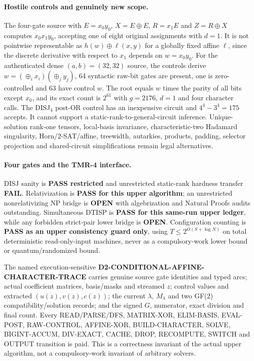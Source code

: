 \documentclass[11pt]{article}
\begin{document}
\paragraph{Hostile controls and genuinely new scope.}
The four-gate source with $E=x_0y_0$, $X=E\oplus E$, $R=x_1E$ and $Z=R\oplus X$ computes $x_0x_1y_0$, accepting one of eight original assignments with $d=1$.
It is not pointwise representable as $h(w)\oplus\ell(x,y)$ for a globally fixed affine $\ell$, since the discrete derivative with respect to $x_1$ depends on $w=x_0y_0$.
For the authenticated dense $(a,b)=(32,32)$ source, the controls derive $w=(\oplus_i x_i)(\oplus_j y_j)$, 64 syntactic raw-bit gates are present, one is zero-controlled and 63 have control $w$.
The root equals $w$ times the parity of all bits except $x_0$, and its exact count is $2^{61}$ with $g=2176$, $d=1$ and four character calls.
The DISJ$_4$ post-OR control has an inexpensive circuit and $4^4-3^4=175$ accepts.  It cannot support a static-rank-to-general-circuit inference. Unique-solution rank-one tensors, local-basis invariance, characteristic-two Hadamard singularity, Horn/2-SAT/affine, treewidth, autarkies, products, padding, selector projection and shared-circuit simplifications remain legal alternatives.

\paragraph{Four gates and the TMR-4 interface.}
DISJ sanity is \textbf{PASS restricted} and unrestricted static-rank hardness transfer \textbf{FAIL}.
Relativization is \textbf{PASS for this upper algorithm}; an unrestricted nonrelativizing NP bridge is \textbf{OPEN} with algebrization and Natural Proofs audits outstanding.
Simultaneous DTISP is \textbf{PASS for this same-run upper ledger}, while any forbidden strict-pair lower bridge is \textbf{OPEN}.
Configuration counting is \textbf{PASS as an upper consistency guard only}, using $T\le2^{O(S+\log N)}$ on total deterministic read-only-input machines, never as a compulsory-work lower bound or quantum/randomized bound.

The named execution-sensitive \textbf{D2-CONDITIONAL-AFFINE-CHARACTER-TRACE} carries genuine source gate identities and typed arcs; actual coefficient matrices, basis/masks and streamed $z$; control values and extracted $(u(z),v(z),c(z))$; the current $\lambda$, $M_\lambda$ and two GF(2) compatibility/solution records; and the signed $G$, numerator, exact division and final count.
Every READ/PARSE/DFS, MATRIX-XOR, ELIM-BASIS, EVAL-POST, RAW-CONTROL, AFFINE-XOR, BUILD-CHARACTER, SOLVE, BIGINT-ACCUM, DIV-EXACT, CACHE, DROP, RECOMPUTE, SWITCH and OUTPUT transition is paid.
This is a correctness invariant of the actual upper algorithm, not a compulsory-work invariant of arbitrary solvers.
\end{document}
